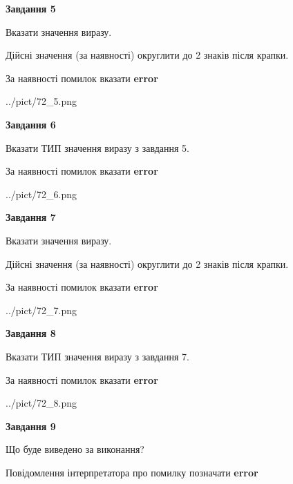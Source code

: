 \documentclass[11pt, ukrainian]{article}
\begin{document}
{\begin {large}
{\begin {center}\textbf{Завдання 5}\end {center}}\par
Вказати значення виразу. \par
Дійсні значення (за наявності) округлити до 2 знаків після крапки. \par
За наявності помилок вказати \textbf{error}

\begin{center}
	{../pict/72_5.png}
\end{center}
\newpage

{\begin {center}\textbf{Завдання 6}\end {center}}\par
Вказати ТИП значення виразу з завдання 5. \par
За наявності помилок вказати \textbf{error}

\begin{center}
	{../pict/72_6.png}
\end{center}
\newpage

{\begin {center}\textbf{Завдання 7}\end {center}}\par
Вказати значення виразу. \par
Дійсні значення (за наявності) округлити до 2 знаків після крапки. \par
За наявності помилок вказати \textbf{error}

\begin{center}
	{../pict/72_7.png}
\end{center}
\newpage

{\begin {center}\textbf{Завдання 8}\end {center}}\par
Вказати ТИП значення виразу з завдання 7. \par
За наявності помилок вказати \textbf{error}

\begin{center}
	{../pict/72_8.png}
\end{center}
\newpage

{\begin {center}\textbf{Завдання 9}\end {center}}\par
Що буде виведено за виконання? \par
Повідомлення інтерпретатора про помилку позначати \textbf{error}


\end{large}}
\end{document}
